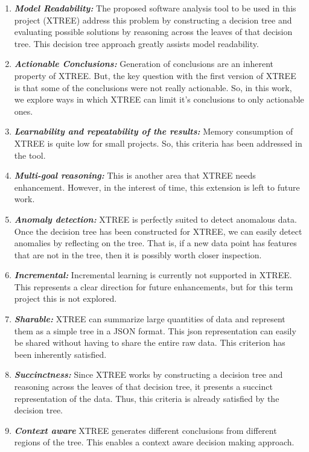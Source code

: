 \documentclass[sigconf, proceedings, 9pt]{acmart}
\begin{document}
\begin{enumerate}[noitemsep,topsep=0pt]
	\item \textit{\textbf{Model Readability:}}
	The proposed software analysis tool to be used in this project (XTREE) address 
	this problem by constructing a decision tree and evaluating possible solutions 
	by reasoning across the leaves of that decision tree. This decision tree 
	approach greatly assists model readability.
	
	\item \textit{\textbf{Actionable Conclusions:}}
	Generation of conclusions are an inherent property of XTREE. But, the key 
	question with the first version of XTREE is that some of the conclusions were 
	not really actionable. So, in this work, we explore ways in which XTREE can 
	limit it's conclusions to only actionable ones.
	
	\item \textit{\textbf{Learnability and repeatability of the results:}} Memory 
	consumption of XTREE is quite low for small 
	projects. So, this criteria has been addressed in the tool.
	
	\item \textit{\textbf{Multi-goal reasoning:}} This is another area that XTREE 
	needs 
	enhancement. However, in the interest of time, this extension is left to 
	future work.
	
	\item \textit{\textbf{Anomaly detection:}} XTREE is perfectly suited to detect 
	anomalous data. Once the decision tree has been constructed for XTREE, we can 
	easily detect anomalies by reflecting on the tree. That is, if a new data 
	point has features that are not in the tree, then it is possibly worth closer 
	inspection.
	
	\item \textit{\textbf{Incremental:}} Incremental learning is currently not 
	supported	in XTREE. This represents a clear direction for future enhancements, 
	but for this term project this is not explored. 
		
 \item \textit{\textbf{Sharable:}} XTREE can summarize large quantities of data 
 and represent them as a simple tree in a JSON format. This json representation 
 can easily be shared without having to share the entire raw data. This 
 criterion has been inherently satisfied.
	
	\item \textit{\textbf{Succinctness:}} Since XTREE works by constructing a 
	decision tree and reasoning across the leaves of that decision tree, it 
	presents a succinct representation of the data. Thus, this criteria is already 
	satisfied by the decision tree.
	
	\item \textit{\textbf{Context aware}} XTREE generates different conclusions 
	from	different regions of the tree. This enables a context aware decision 
	making approach.
	
\end{enumerate}
\end{document}
